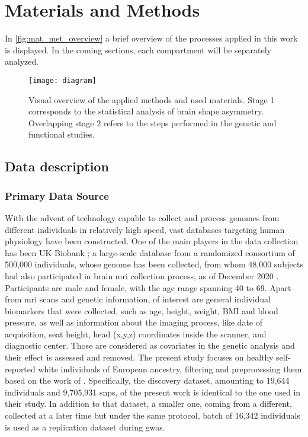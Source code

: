 \chapter{Materials and Methods}\label{chap:mat_and_methods}
In \autoref{fig:mat_met_overview} a brief overview of the processes applied in this work is displayed. In the coming sections, each compartment will be separately analyzed.

\begin{figure}[H]
	\centering
	\texttt{[image: diagram]}
	\caption[Visual overview of methods and materials]{Visual overview of the applied methods and used materials. Stage 1 corresponds to the statistical analysis of brain shape asymmetry. Overlapping stage 2 refers to the steps performed in the genetic and functional studies.}
	\label{fig:mat_met_overview}
\end{figure}


\section{Data description}
\subsection{Primary Data Source}
\label{subsec:primary_data_source}
With the advent of technology capable to collect and process genomes from different individuals in relatively high speed, vast databases targeting human physiology have been constructed. One of the main players in the data collection has been UK Biobank \cite{Bycroft2018}; a large-scale database from a randomized consortium of 500,000 individuals, whose genome has been collected, from whom  48,000 subjects had also participated in brain \ac{mri} collection process, as of December 2020 \cite{Littlejohns2020}. Participants are male and female, with the age range spanning 40 to 69. Apart from \ac{mri} scans and genetic information, of interest are general individual biomarkers that were collected, such as age, height, weight, BMI and blood pressure, as well as information about the imaging process, like date of acquisition, seat height, head (x,y,z) coordinates inside the scanner, and diagnostic center. Those are considered as covariates in the genetic analysis and their effect is assessed and removed. The present study focuses on healthy self-reported white individuals of European ancestry, filtering and preprocessing them based on the work of \citet{Naqvi2021}. Specifically, the discovery dataset, amounting to 19,644 individuals and 9,705,931 \acp{snp}, of the present work is identical to the one used in their study. In addition to that dataset, a smaller one, coming from a different, collected at a later time but under the same protocol, batch of 16,342 individuals is used as a replication dataset during \ac{gwas}.

